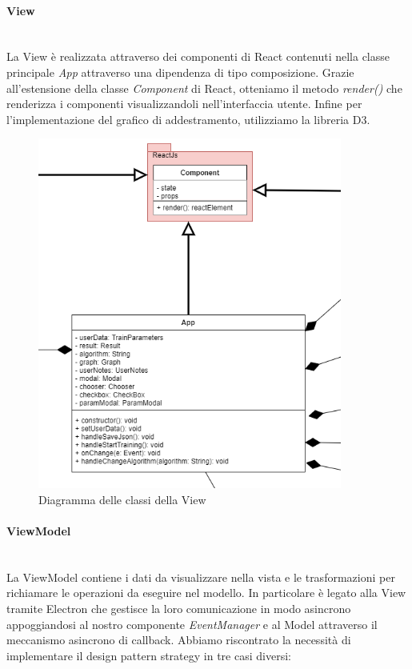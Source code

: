 		\paragraph{View} \mbox{} \\[1mm]
		La View è realizzata attraverso dei componenti di React contenuti nella classe principale \textit{App} attraverso una dipendenza di tipo composizione. Grazie all'estensione della classe \textit{Component} di React, otteniamo il metodo \textit{render()} che renderizza i componenti visualizzandoli nell'interfaccia utente.
		Infine per l'implementazione del grafico di addestramento, utilizziamo la libreria D3.
		\mbox{}
				\begin{figure} [H]
					\begin{center}
						\includegraphics[width=100mm]{img/Diagrammi/view-app.png}
					\end{center}
					\caption{Diagramma delle classi della View}
				\end{figure}
	
		\paragraph{ViewModel} \mbox{} \\[1mm]
		La ViewModel contiene i dati da visualizzare nella vista e le trasformazioni per richiamare le operazioni da eseguire nel modello.
		In particolare è legato alla View tramite Electron che gestisce la loro comunicazione in modo asincrono appoggiandosi al nostro componente \textit{EventManager} e al Model attraverso il meccanismo asincrono di callback.
		Abbiamo riscontrato la necessità di implementare il design pattern strategy in tre casi diversi:
